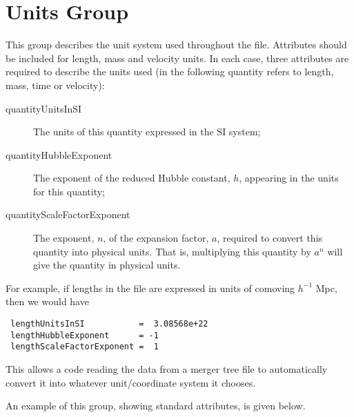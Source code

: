 \section{Units Group}\label{sec:UnitsGroup}

This group describes the unit system used throughout the file. Attributes should be included for length, mass and velocity units. In each case, three attributes are required to describe the units used (in the following {\normalfont \ttfamily quantity} refers to {\normalfont \ttfamily length}, {\normalfont \ttfamily mass}, {\normalfont \ttfamily time} or {\normalfont \ttfamily velocity}):
\begin{description}
 \item [{\normalfont \ttfamily quantityUnitsInSI}] The units of this quantity expressed in the SI system;
 \item [{\normalfont \ttfamily quantityHubbleExponent}] The exponent of the reduced Hubble constant, $h$, appearing in the units for this quantity;
 \item [{\normalfont \ttfamily quantityScaleFactorExponent}] The exponent, $n$,  of the expansion factor, $a$, required to convert this quantity into physical units. That is, multiplying this quantity by $a^n$ will give the quantity in physical units.
\end{description}
For example, if lengths in the file are expressed in units of comoving $h^{-1}$ Mpc, then we would have
\begin{verbatim}
 lengthUnitsInSI           =  3.08568e+22
 lengthHubbleExponent      = -1
 lengthScaleFactorExponent =  1
\end{verbatim}
This allows a code reading the data from a merger tree file to automatically convert it into whatever unit/coordinate system it chooses.

An example of this group, showing standard attributes, is given below.


